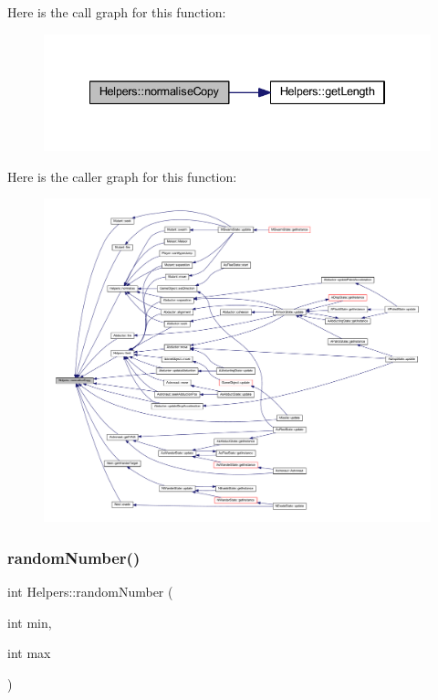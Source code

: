 Here is the call graph for this function\+:
\nopagebreak
\begin{figure}[H]
\begin{center}
\leavevmode
\includegraphics[width=334pt]{namespace_helpers_a1c0a40432177c275488a904ea94eda66_cgraph}
\end{center}
\end{figure}
Here is the caller graph for this function\+:
\nopagebreak
\begin{figure}[H]
\begin{center}
\leavevmode
\includegraphics[width=350pt]{namespace_helpers_a1c0a40432177c275488a904ea94eda66_icgraph}
\end{center}
\end{figure}
\mbox{\label{namespace_helpers_af4d3e03c8af50c930d3164b155f02e98}} 
\subsubsection{\texorpdfstring{random\+Number()}{randomNumber()}}
{\footnotesize\ttfamily int Helpers\+::random\+Number (\begin{DoxyParamCaption}\item[{int}]{min,  }\item[{int}]{max }\end{DoxyParamCaption})\hspace{0.3cm}{\ttfamily [inline]}}

